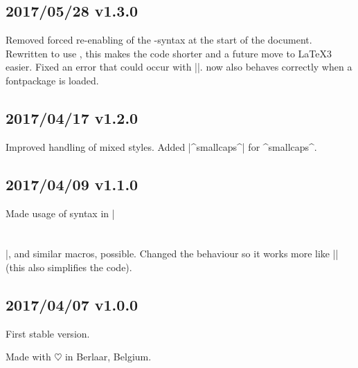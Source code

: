 \documentclass[11pt, cm-default]{l3doc}
\begin{document}
	\subsection*{2017/05/28 v1.3.0}
	Removed forced re-enabling of the -syntax at the start of the document.
	Rewritten to use , this makes the code shorter and a future move to \LaTeX3 easier.
	Fixed an error that could occur with |\cir|.
	 now also behaves correctly when a fontpackage is loaded.

	\subsection*{2017/04/17 v1.2.0}
	Improved handling of mixed styles.
	Added |^smallcaps^| for ^smallcaps^.

	\subsection*{2017/04/09 v1.1.0}
	Made usage of syntax in |\section{}|, and similar macros, possible. Changed the behaviour so it works more like |\emph{}| (this also simplifies the code).

	\subsection*{2017/04/07 v1.0.0}
	First stable version.

	\vspace*{\fill}\noindent
	Made with $\heartsuit$ in Berlaar, Belgium.
	\clearpage
\end{document}
